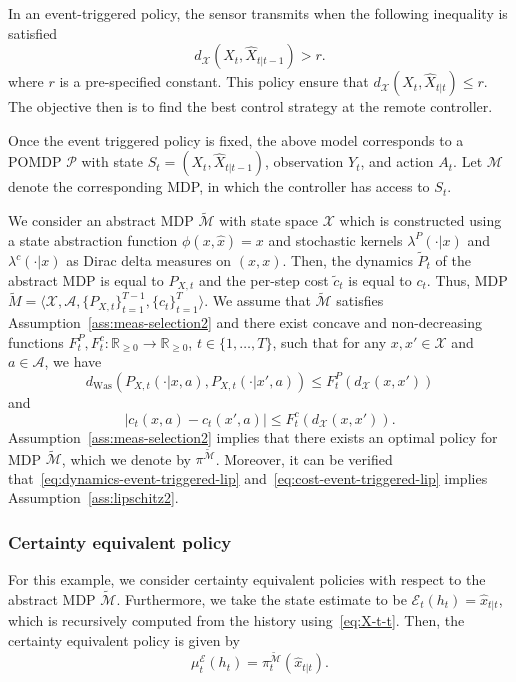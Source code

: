 \documentclass[letterpaper, 10pt]{IEEEtran}
\theoremstyle{plain}
\theoremstyle{nonumberplain}
\theoremstyle{plain}
\newcommand*\ALPHABET{\mathcal}
\newcommand*\ABSTRACT{\tilde}
\newcommand*\reals{\mathds{R}}
\newcommand\dWas{d_{\mathrm{Was}}}
\newcommand\EST{\mathcal{E}}
\begin{document}
In an event-triggered policy, the sensor transmits when the following inequality is satisfied
\[
    d_{\ALPHABET X}(X_t, \hat X_{t|t-1}) > r.
\]
where $r$ is a pre-specified constant. This policy ensure that $d_{\ALPHABET X}(X_t, \hat X_{t|t}) \le r$. The objective then is to find the best control strategy at the remote controller.

Once the event triggered policy is fixed, the above model corresponds to a POMDP $\ALPHABET P$ with state $S_t = (X_t, \hat X_{t|t-1})$, observation $Y_t$, and action $A_t$. Let $\ALPHABET M$ denote the corresponding MDP, in which the controller has access to $S_t$. 

We consider an abstract MDP $\ABSTRACT{\ALPHABET M}$ with state space $\ALPHABET X$ which is constructed using a state abstraction function $\phi(x, \hat x) = x$ and stochastic kernels $\lambda^P(\cdot | x)$ and $\lambda^c(\cdot | x)$ as Dirac delta measures on $(x,x)$. Then, the dynamics $\tilde P_t$ of the abstract MDP is equal to $P_{X,t}$ and the per-step cost $\tilde c_t$ is equal to $c_t$. Thus, MDP $\tilde M = \langle \ALPHABET X, \ALPHABET A, \{ P_{X,t}\}_{t=1}^{T-1}, \{ c_t\}_{t=1}^T \rangle$.  We assume that $\ABSTRACT{\ALPHABET M}$ satisfies Assumption~\ref{ass:meas-selection2} and there exist concave and non-decreasing functions $F^P_t, F^c_t \colon \reals_{\ge 0} \to \reals_{\ge 0}$, $t \in \{1, \dots, T\}$, such that for any $x,x' \in \ALPHABET X$ and $a \in \ALPHABET A$, we have
\begin{equation}\label{eq:dynamics-event-triggered-lip}
     \dWas(P_{X,t}(\cdot | x, a), P_{X,t}(\cdot | x', a)) \le F^P_t(d_{\ALPHABET X}(x, x'))
\end{equation}
and
\begin{equation}\label{eq:cost-event-triggered-lip}
    \bigl| c_t(x,a) - c_t(x',a) \bigr| \le F^c_t(d_{\ALPHABET X}(x, x')).
\end{equation}
Assumption~\ref{ass:meas-selection2} implies that there exists an optimal policy for MDP $\ABSTRACT{\ALPHABET M}$, which we denote by $\pi^{\ABSTRACT {\ALPHABET M}}$. Moreover, it can be verified that~\eqref{eq:dynamics-event-triggered-lip} and~\eqref{eq:cost-event-triggered-lip} implies Assumption~\ref{ass:lipschitz2}.


\subsubsection{Certainty equivalent policy}
For this example, we consider certainty equivalent policies with respect to the abstract MDP $\ABSTRACT{\ALPHABET M}$.  Furthermore, we take the state estimate to be $\EST_t(h_t) = \hat x_{t|t}$, which is recursively computed from the history using~\eqref{eq:X-t-t}. Then, the certainty equivalent policy is given by
\[
    \mu_t^{\EST}(h_t) = \pi^{\ABSTRACT{\ALPHABET M}}_t(\hat x_{t|t}).
\]
\end{document}
